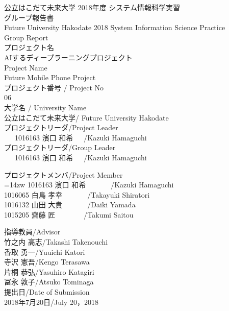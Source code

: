 \begin{center}
{\Large 公立はこだて未来大学 2018年度 システム情報科学実習\\[-1mm]グループ報告書\\[2mm] Future University Hakodate 2018 System Information Science Practice\\ [-1mm]Group Report\\[10mm]}
{\large プロジェクト名\\[-1mm]AIするディープラーニングプロジェクト\\[1mm]Project Name\\[-1mm]Future Mobile Phone Project}\\[10mm]
プロジェクト番号 / Project No\\
06\\[10mm]
{\normalsize 大学名 / University Name\\[-1mm]公立はこだて未来大学/ Future University Hakodate}\\[5mm]
{\normalsize プロジェクトリーダ/Project Leader}\\[-1mm]
\ \ \ 1016163 濱口 和希\ \ \ /Kazuki Hamaguchi\\[10mm]
{\normalsize プロジェクトリーダ/Group Leader}\\[-1mm]
\ \ \ 1016163 濱口 和希\ \ \ /Kazuki Hamaguchi\\[10mm]
\begin{center}
プロジェクトメンバ/Project Member\\
\leftskip=14zw
1016163 濱口 和希\ \ \ \ \ \ \ /Kazuki Hamaguchi\\
1016065 白鳥 孝幸\ \ \ \ \ \ \ /Takayuki Shiratori\\
1016132 山田 大貴\ \ \ \ \ \ \ /Daiki Yamada\\
1015205 齋藤 匠\ \ \ \ \ \ \ \ /Takumi Saitou \\
[10mm]
\end{center}
指導教員/Advisor\\
竹之内 高志/Takashi Takenouchi\\
香取 勇一/Yuuichi Katori\\
寺沢 憲吾/Kengo Terasawa\\
片桐 恭弘/Yasuhiro Katagiri\\
冨永 敦子/Atsuko Tominaga\\


提出日/Date of Submission\\
2018年7月20日/July 20，2018\\
\end{center}
